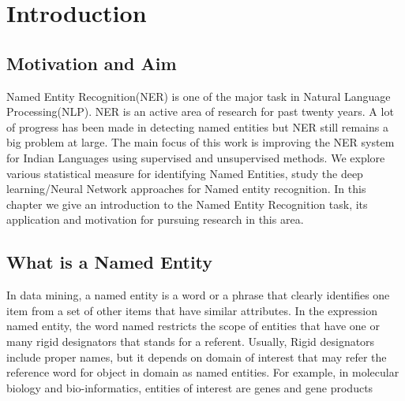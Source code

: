 \documentclass[12pt,a4paper]{article}
\begin{document}
\section{Introduction}


\subsection{Motivation and Aim}
Named Entity Recognition(NER) is one of the major task in Natural Language Processing(NLP). NER
is an active area of research for past twenty years. A lot of progress has been made in detecting named
entities but NER still remains a big problem at large.
The main focus of this work is improving the NER system for Indian Languages using supervised
and unsupervised methods. We explore various statistical measure for identifying Named Entities, study
the deep learning/Neural Network approaches for Named entity recognition. In this chapter we give an
introduction to the Named Entity Recognition task, its application and motivation for pursuing research
in this area.
\subsection{What is a Named Entity}
In data mining, a named entity is a word or a phrase that clearly identifies one item from a set of other
items that have similar attributes. In the expression named entity, the word named restricts the scope
of entities that have one or many rigid designators that stands for a referent. Usually, Rigid designators
include proper names, but it depends on domain of interest that may refer the reference word for object
in domain as named entities. For example, in molecular biology and bio-informatics, entities of interest
are genes and gene products
\end{document}
